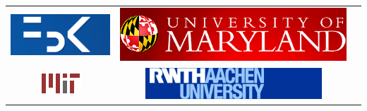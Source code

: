 \documentclass[landscape]{uedslides2C}
\begin{document}
\begin{table}[h]
\begin{center}
\begin{tabular}{ c  c  c }
\\[1cm]
\includegraphics[scale=1]{fbk.png} 
&
\includegraphics[scale=0.6]{maryland.png}
\\[1cm]
\includegraphics[scale=1.5]{mit.png}
&
\includegraphics[scale=1]{aachen.png}
\end{tabular}
\end{center}
\end{table}
\end{document}

